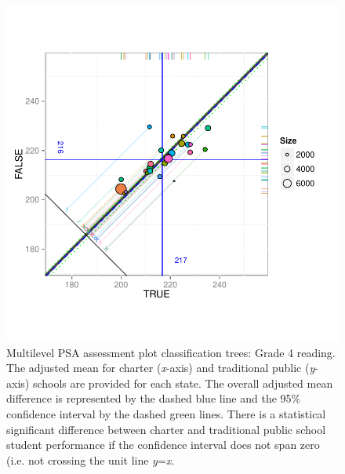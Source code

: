 \begin{figure}[h!]
\begin{center}
\includegraphics[width=\textwidth,trim=0 .6in 0 .6in]{../Figures2009/g4read-mlpsa-ctree-circ.pdf}
\caption[Multilevel PSA assessment plot classification trees: Grade 4 reading]{Multilevel PSA assessment plot classification trees: Grade 4 reading. The adjusted mean for charter (\textit{x}-axis) and traditional public (\textit{y}-axis) schools are provided for each state. The overall adjusted mean difference is represented by the dashed blue line and the 95\% confidence interval by the dashed green lines. There is a statistical significant difference between charter and traditional public school student performance if the confidence interval does not span zero (i.e. not crossing the unit line \textit{y}=\textit{x}.}
\end{center}
\end{figure}

